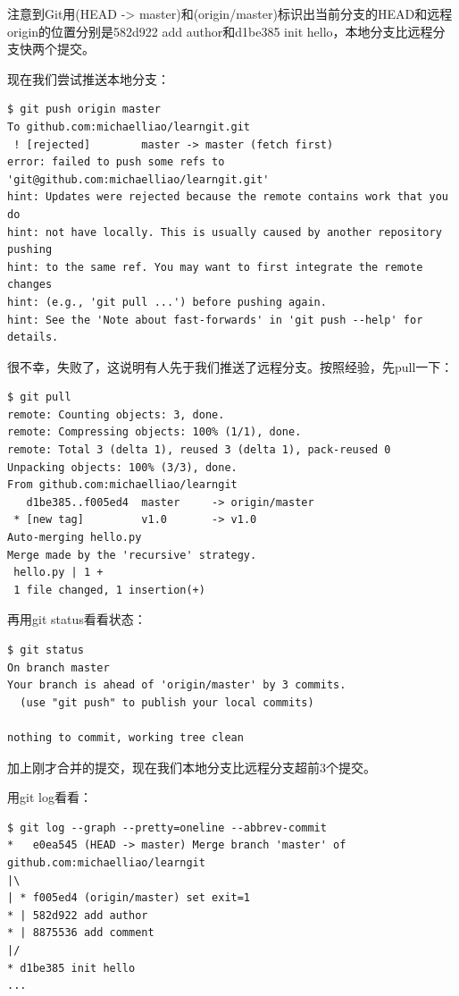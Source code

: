 注意到Git用(HEAD -> master)和(origin/master)标识出当前分支的HEAD和远程origin的位置分别是582d922 add author和d1be385 init hello，本地分支比远程分支快两个提交。

现在我们尝试推送本地分支：

\begin{verbatim}
$ git push origin master
To github.com:michaelliao/learngit.git
 ! [rejected]        master -> master (fetch first)
error: failed to push some refs to 'git@github.com:michaelliao/learngit.git'
hint: Updates were rejected because the remote contains work that you do
hint: not have locally. This is usually caused by another repository pushing
hint: to the same ref. You may want to first integrate the remote changes
hint: (e.g., 'git pull ...') before pushing again.
hint: See the 'Note about fast-forwards' in 'git push --help' for details.
\end{verbatim}

很不幸，失败了，这说明有人先于我们推送了远程分支。按照经验，先pull一下：

\begin{verbatim}
$ git pull
remote: Counting objects: 3, done.
remote: Compressing objects: 100% (1/1), done.
remote: Total 3 (delta 1), reused 3 (delta 1), pack-reused 0
Unpacking objects: 100% (3/3), done.
From github.com:michaelliao/learngit
   d1be385..f005ed4  master     -> origin/master
 * [new tag]         v1.0       -> v1.0
Auto-merging hello.py
Merge made by the 'recursive' strategy.
 hello.py | 1 +
 1 file changed, 1 insertion(+)
\end{verbatim}

再用git status看看状态：

\begin{verbatim}
$ git status
On branch master
Your branch is ahead of 'origin/master' by 3 commits.
  (use "git push" to publish your local commits)

nothing to commit, working tree clean
\end{verbatim}

加上刚才合并的提交，现在我们本地分支比远程分支超前3个提交。

用git log看看：

\begin{verbatim}
$ git log --graph --pretty=oneline --abbrev-commit
*   e0ea545 (HEAD -> master) Merge branch 'master' of github.com:michaelliao/learngit
|\  
| * f005ed4 (origin/master) set exit=1
* | 582d922 add author
* | 8875536 add comment
|/  
* d1be385 init hello
...
\end{verbatim}

